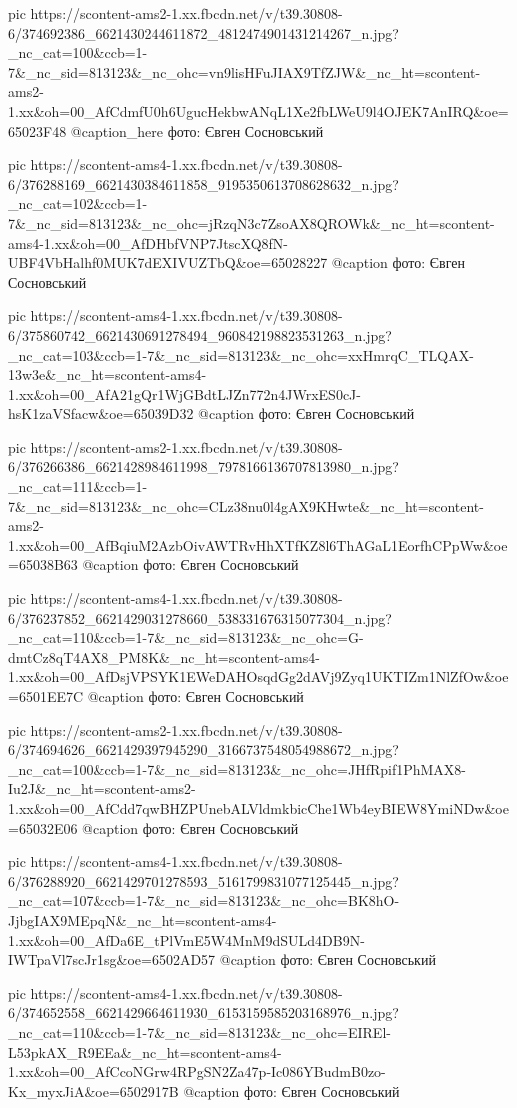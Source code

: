      pic https://scontent-ams2-1.xx.fbcdn.net/v/t39.30808-6/374692386_6621430244611872_4812474901431214267_n.jpg?_nc_cat=100&ccb=1-7&_nc_sid=813123&_nc_ohc=vn9lisHFuJIAX9TfZJW&_nc_ht=scontent-ams2-1.xx&oh=00_AfCdmfU0h6UgucHekbwANqL1Xe2fbLWeU9l4OJEK7AnIRQ&oe=65023F48
     @caption_here фото: Євген Сосновський

     pic https://scontent-ams4-1.xx.fbcdn.net/v/t39.30808-6/376288169_6621430384611858_9195350613708628632_n.jpg?_nc_cat=102&ccb=1-7&_nc_sid=813123&_nc_ohc=jRzqN3c7ZsoAX8QROWk&_nc_ht=scontent-ams4-1.xx&oh=00_AfDHbfVNP7JtscXQ8fN-UBF4VbHalhf0MUK7dEXIVUZTbQ&oe=65028227
     @caption фото: Євген Сосновський

     pic https://scontent-ams4-1.xx.fbcdn.net/v/t39.30808-6/375860742_6621430691278494_960842198823531263_n.jpg?_nc_cat=103&ccb=1-7&_nc_sid=813123&_nc_ohc=xxHmrqC_TLQAX-13w3e&_nc_ht=scontent-ams4-1.xx&oh=00_AfA21gQr1WjGBdtLJZn772n4JWrxES0cJ-hsK1zaVSfacw&oe=65039D32
     @caption фото: Євген Сосновський

     pic https://scontent-ams2-1.xx.fbcdn.net/v/t39.30808-6/376266386_6621428984611998_7978166136707813980_n.jpg?_nc_cat=111&ccb=1-7&_nc_sid=813123&_nc_ohc=CLz38nu0l4gAX9KHwte&_nc_ht=scontent-ams2-1.xx&oh=00_AfBqiuM2AzbOivAWTRvHhXTfKZ8l6ThAGaL1EorfhCPpWw&oe=65038B63
     @caption фото: Євген Сосновський

     pic https://scontent-ams4-1.xx.fbcdn.net/v/t39.30808-6/376237852_6621429031278660_538331676315077304_n.jpg?_nc_cat=110&ccb=1-7&_nc_sid=813123&_nc_ohc=G-dmtCz8qT4AX8_PM8K&_nc_ht=scontent-ams4-1.xx&oh=00_AfDsjVPSYK1EWeDAHOsqdGg2dAVj9Zyq1UKTIZm1NlZfOw&oe=6501EE7C
     @caption фото: Євген Сосновський

     pic https://scontent-ams2-1.xx.fbcdn.net/v/t39.30808-6/374694626_6621429397945290_3166737548054988672_n.jpg?_nc_cat=100&ccb=1-7&_nc_sid=813123&_nc_ohc=JHfRpif1PhMAX8-Iu2J&_nc_ht=scontent-ams2-1.xx&oh=00_AfCdd7qwBHZPUnebALVldmkbicChe1Wb4eyBIEW8YmiNDw&oe=65032E06
     @caption фото: Євген Сосновський

     pic https://scontent-ams4-1.xx.fbcdn.net/v/t39.30808-6/376288920_6621429701278593_5161799831077125445_n.jpg?_nc_cat=107&ccb=1-7&_nc_sid=813123&_nc_ohc=BK8hO-JjbgIAX9MEpqN&_nc_ht=scontent-ams4-1.xx&oh=00_AfDa6E_tPlVmE5W4MnM9dSULd4DB9N-IWTpaVl7scJr1sg&oe=6502AD57
     @caption фото: Євген Сосновський

     pic https://scontent-ams4-1.xx.fbcdn.net/v/t39.30808-6/374652558_6621429664611930_6153159585203168976_n.jpg?_nc_cat=110&ccb=1-7&_nc_sid=813123&_nc_ohc=EIREl-L53pkAX_R9EEa&_nc_ht=scontent-ams4-1.xx&oh=00_AfCcoNGrw4RPgSN2Za47p-Ic086YBudmB0zo-Kx_myxJiA&oe=6502917B
     @caption фото: Євген Сосновський

